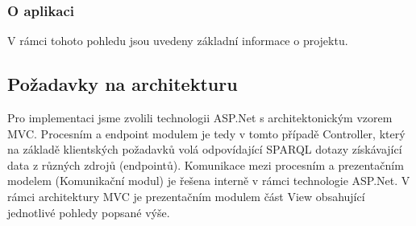 

\subsubsection*{O aplikaci}

V rámci tohoto pohledu jsou uvedeny základní informace o projektu.

\subsection{Požadavky na architekturu}

Pro implementaci jsme zvolili technologii ASP.Net s architektonickým vzorem MVC. Procesním a endpoint modulem je tedy v tomto případě Controller, který na základě klientských požadavků volá odpovídající SPARQL dotazy získávající data z různých zdrojů (endpointů). Komunikace mezi procesním a prezentačním modelem (Komunikační modul) je řešena interně v rámci technologie ASP.Net. V rámci architektury MVC je prezentačním modulem část View obsahující jednotlivé pohledy popsané výše.


